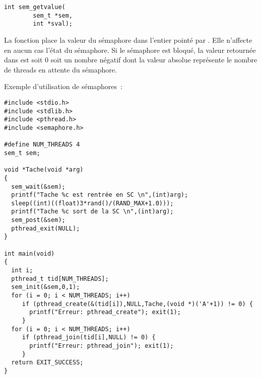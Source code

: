 \begin{lstlisting}
int sem_getvalue(
		sem_t *sem,
		int *sval);
\end{lstlisting}

La fonction  place la valeur du sémaphore dans l'entier pointé par . Elle n'affecte en aucun cas l'état du sémaphore. Si le sémaphore est bloqué, la valeur retournée dans  est soit 0 soit un nombre négatif dont la valeur absolue représente le nombre de threads en attente du sémaphore.

Exemple d'utilisation de sémaphores~:
\begin{lstlisting}
#include <stdio.h>
#include <stdlib.h>
#include <pthread.h>
#include <semaphore.h>

#define NUM_THREADS 4
sem_t sem;

void *Tache(void *arg)
{
  sem_wait(&sem);
  printf("Tache %c est rentrée en SC \n",(int)arg);
  sleep((int)((float)3*rand()/(RAND_MAX+1.0)));
  printf("Tache %c sort de la SC \n",(int)arg);
  sem_post(&sem);
  pthread_exit(NULL);
}

int main(void)
{
  int i;
  pthread_t tid[NUM_THREADS];
  sem_init(&sem,0,1);
  for (i = 0; i < NUM_THREADS; i++)
     if (pthread_create(&(tid[i]),NULL,Tache,(void *)('A'+1)) != 0) {
       printf("Erreur: pthread_create"); exit(1);
     }
  for (i = 0; i < NUM_THREADS; i++)
     if (pthread_join(tid[i],NULL) != 0) {
       printf("Erreur: pthread_join"); exit(1);
     }
  return EXIT_SUCCESS;
}
\end{lstlisting}
